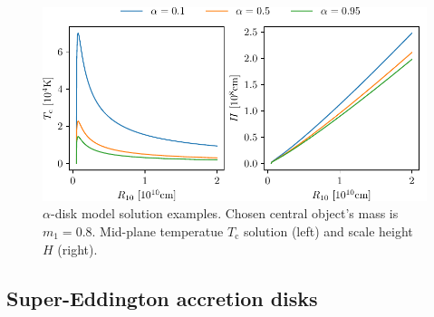     \begin{figure}[h]
        \centering
        \includegraphics[scale=1.0]{img/plot_alpha_H_T.pdf}
        \caption{$\alpha$-disk model solution examples. Chosen central object's mass is $m_1 = 0.8$. Mid-plane temperatue $T_{\mathrm{c}}$ solution (left) and scale height $H$ (right).}
        \label{fig:plot_alpha_H_T}
    \end{figure}

\subsection{Super-Eddington accretion disks}
    
